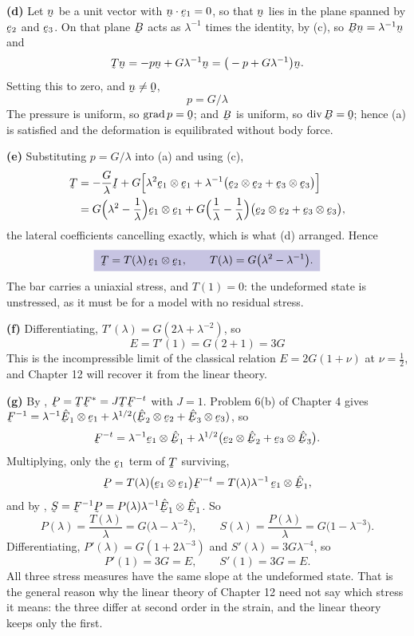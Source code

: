 \begin{solution}
\textbf{(d)} Let $\bn$ be a unit vector with $\ip\bn{\be_{1}}=0$, so
that $\bn$ lies in the plane spanned by $\be_{2}$ and $\be_{3}$. On that
plane $\bB$ acts as $\lambda^{-1}$ times the identity, by (c), so
$\bB\bn=\lambda^{-1}\bn$ and
\[
   \bT\bn=-p\bn+G\lambda^{-1}\bn
   =\big(-p+G\lambda^{-1}\big)\bn .
\]
Setting this to zero, and $\bn\neq\bze$,
\[
   \boxed{\;p=G/\lambda\;}
\]
The pressure is uniform, so $\grad p=\bze$; and $\bB$ is uniform, so
$\dvg\bB=\bze$; hence (a) is satisfied and the deformation is
equilibrated without body force.

\textbf{(e)} Substituting $p=G/\lambda$ into (a) and using (c),
\[
\begin{aligned}
   \bT&=-\frac{G}{\lambda}\I+G\Big[\lambda^{2}\be_{1}\otimes\be_{1}
   +\lambda^{-1}\big(\be_{2}\otimes\be_{2}
   +\be_{3}\otimes\be_{3}\big)\Big]\\
   &=G\Big(\lambda^{2}-\frac{1}{\lambda}\Big)\be_{1}\otimes\be_{1}
   +G\Big(\frac{1}{\lambda}-\frac{1}{\lambda}\Big)
   \big(\be_{2}\otimes\be_{2}+\be_{3}\otimes\be_{3}\big),
\end{aligned}
\]
the lateral coefficients cancelling exactly, which is what (d) arranged.
Hence
\[
   \boxed{\;\bT=T(\lambda)\,\be_{1}\otimes\be_{1},\qquad
   T(\lambda)=G\big(\lambda^{2}-\lambda^{-1}\big).\;}
\]
The bar carries a uniaxial stress, and $T(1)=0$: the undeformed state is
unstressed, as it must be for a model with no residual stress.

\textbf{(f)} Differentiating,
$T'(\lambda)=G(2\lambda+\lambda^{-2})$, so
\[
   \boxed{\;E=T'(1)=G(2+1)=3G\;}
\]
This is the incompressible limit of the classical relation
$E=2G(1+\nu)$ at $\nu=\tfrac12$, and Chapter 12 will recover it from the
linear theory.

\textbf{(g)} By , $\bP=\bT\bF^{*}=J\bT\bF^{-t}$ with $J=1$.
Problem 6(b) of Chapter 4 gives
$\bF^{-1}=\lambda^{-1}\hbE_{1}\otimes\be_{1}
+\lambda^{1/2}(\hbE_{2}\otimes\be_{2}+\hbE_{3}\otimes\be_{3})$, so
\[
   \bF^{-t}=\lambda^{-1}\be_{1}\otimes\hbE_{1}
   +\lambda^{1/2}\big(\be_{2}\otimes\hbE_{2}
   +\be_{3}\otimes\hbE_{3}\big).
\]
Multiplying, only the $\be_{1}$ term of $\bT$ surviving,
\[
   \bP=T(\lambda)\big(\be_{1}\otimes\be_{1}\big)\bF^{-t}
   =T(\lambda)\lambda^{-1}\,\be_{1}\otimes\hbE_{1},
\]
and by , $\bS=\bF^{-1}\bP=P(\lambda)\lambda^{-1}
\hbE_{1}\otimes\hbE_{1}$. So
\[
   \boxed{\;P(\lambda)=\frac{T(\lambda)}{\lambda}
   =G\big(\lambda-\lambda^{-2}\big),\qquad
   S(\lambda)=\frac{P(\lambda)}{\lambda}
   =G\big(1-\lambda^{-3}\big).\;}
\]
Differentiating, $P'(\lambda)=G(1+2\lambda^{-3})$ and
$S'(\lambda)=3G\lambda^{-4}$, so
\[
   P'(1)=3G=E,\qquad S'(1)=3G=E .
\]
All three stress measures have the same slope at the undeformed state.
That is the general reason why the linear theory of Chapter 12 need not
say which stress it means: the three differ at second order in the
strain, and the linear theory keeps only the first.
\end{solution}

